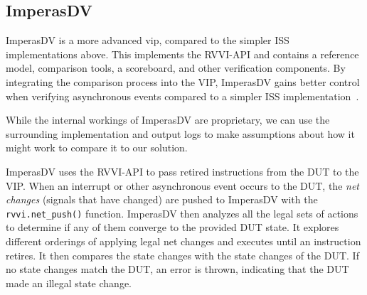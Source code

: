 %    


\subsection{ImperasDV}
\label{sec:imperasdv}

ImperasDV is a more advanced \acrfull{vip}, compared to the simpler ISS implementations above. This implements the RVVI-API and contains a reference model, comparison tools, a scoreboard, and other verification components. By integrating the comparison process into the VIP, ImperasDV gains better control when verifying asynchronous events compared to a simpler ISS implementation~\cite{taylorAdvancedRISCVVerification2023}. 

While the internal workings of ImperasDV are proprietary, we can use the surrounding implementation and output logs \cite{ISSMismatchPending2023} to make assumptions about how it might work to compare it to our solution.

ImperasDV uses the RVVI-API to pass retired instructions from the DUT to the VIP. When an interrupt or other asynchronous event occurs to the DUT, the \textit{net changes} (signals that have changed) are pushed to ImperasDV with the \lstinline{rvvi.net_push()} function. ImperasDV then analyzes all the legal sets of actions to determine if any of them converge to the provided DUT state. 
It explores different orderings of applying legal net changes and executes until an instruction retires. It then compares the state changes with the state changes of the DUT. If no state changes match the DUT, an error is thrown, indicating that the DUT made an illegal state change.

